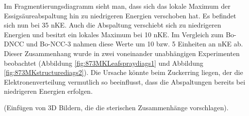 Im Fragmentierungsdiagramm sieht man, dass sich das lokale Maximum der Essigsäureabspaltung hin zu niedrigeren Energien verschoben hat. Es befindet sich nun bei  35 \gls{nKE}. Auch die  Abspaltung verschiebt sich zu niedrigeren Energien und besitzt ein lokales Maximum bei 10 \gls{nKE}. Im Vergleich zum Bo-DNCC und Bo-NCC-3 nahmen diese Werte um 10 bzw. 5 Einheiten an \gls{nKE} ab. Dieser Zusammenhang wurde in zwei voneinander unabhängigen Experimenten beobachtet (Abbildung \ref{fig:873MKLeafspraydiags1} und Abbildung \ref{fig:873MKstructurediags2}). Die Ursache könnte beim Zuckerring liegen, der die Elektronenverteilung vermutlich so beeinflusst, dass die Abspaltungen bereits bei niedrigeren Energien erfolgen. 

(Einfügen von 3D Bildern, die die sterischen Zusammenhänge vorschlagen).

